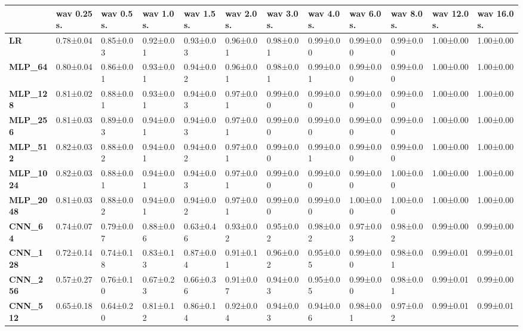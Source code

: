 \begin{tabular}{llllllllllll}
\toprule
{} & wav 0.25 s. & wav 0.5 s. & wav 1.0 s. & wav 1.5 s. & wav 2.0 s. & wav 3.0 s. & wav 4.0 s. & wav 6.0 s. & wav 8.0 s. & wav 12.0 s. & wav 16.0 s. \\
\midrule
\textbf{LR            } &   0.78±0.04 &  0.85±0.03 &  0.92±0.01 &  0.93±0.03 &  0.96±0.01 &  0.98±0.01 &  0.99±0.00 &  0.99±0.00 &  0.99±0.00 &   1.00±0.00 &   1.00±0.00 \\
\textbf{MLP\_64        } &   0.80±0.04 &  0.86±0.01 &  0.93±0.01 &  0.94±0.02 &  0.96±0.01 &  0.98±0.01 &  0.99±0.01 &  0.99±0.00 &  0.99±0.00 &   1.00±0.00 &   1.00±0.00 \\
\textbf{MLP\_128       } &   0.81±0.02 &  0.88±0.01 &  0.93±0.01 &  0.94±0.03 &  0.97±0.01 &  0.99±0.00 &  0.99±0.00 &  0.99±0.00 &  0.99±0.00 &   1.00±0.00 &   1.00±0.00 \\
\textbf{MLP\_256       } &   0.81±0.03 &  0.89±0.03 &  0.94±0.01 &  0.94±0.03 &  0.97±0.01 &  0.99±0.00 &  0.99±0.00 &  0.99±0.00 &  0.99±0.00 &   1.00±0.00 &   1.00±0.00 \\
\textbf{MLP\_512       } &   0.82±0.03 &  0.88±0.02 &  0.94±0.01 &  0.94±0.02 &  0.97±0.01 &  0.99±0.00 &  0.99±0.01 &  0.99±0.00 &  0.99±0.00 &   1.00±0.00 &   1.00±0.00 \\
\textbf{MLP\_1024      } &   0.82±0.03 &  0.88±0.01 &  0.94±0.01 &  0.94±0.03 &  0.97±0.01 &  0.99±0.00 &  0.99±0.00 &  0.99±0.00 &  1.00±0.00 &   1.00±0.00 &   1.00±0.00 \\
\textbf{MLP\_2048      } &   0.81±0.03 &  0.88±0.02 &  0.94±0.01 &  0.94±0.02 &  0.97±0.01 &  0.99±0.00 &  0.99±0.00 &  1.00±0.00 &  1.00±0.00 &   1.00±0.00 &   1.00±0.00 \\
\textbf{CNN\_64        } &   0.74±0.07 &  0.79±0.07 &  0.88±0.06 &  0.63±0.46 &  0.93±0.02 &  0.95±0.02 &  0.98±0.02 &  0.97±0.03 &  0.98±0.02 &   0.99±0.00 &   0.99±0.00 \\
\textbf{CNN\_128       } &   0.72±0.14 &  0.74±0.18 &  0.83±0.13 &  0.87±0.04 &  0.91±0.11 &  0.96±0.02 &  0.95±0.05 &  0.99±0.00 &  0.98±0.01 &   0.99±0.01 &   0.99±0.01 \\
\textbf{CNN\_256       } &   0.57±0.27 &  0.76±0.10 &  0.67±0.23 &  0.66±0.36 &  0.91±0.07 &  0.94±0.03 &  0.95±0.05 &  0.99±0.00 &  0.98±0.01 &   0.99±0.01 &   0.99±0.00 \\
\textbf{CNN\_512       } &   0.65±0.18 &  0.64±0.20 &  0.81±0.12 &  0.86±0.14 &  0.92±0.04 &  0.94±0.03 &  0.94±0.06 &  0.98±0.01 &  0.97±0.02 &   0.99±0.01 &   0.99±0.01 \\

\end{tabular}

